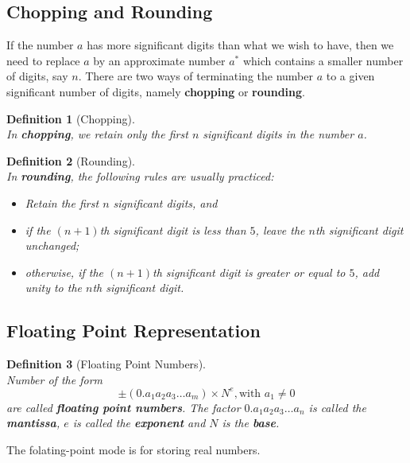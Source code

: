 \documentclass[12pt]{article}
\newtheorem{definition}{Definition}[section]
\theoremstyle{definition}
\begin{document}
\subsection{Chopping and Rounding}
If the number $a$ has more significant digits than what we wish to have, then we need to replace $a$ by an approximate number $a^\ast$ which contains a smaller number of digits, say $n$. There are two ways of terminating the number $a$ to a given significant number of digits, namely \textbf{chopping} or \textbf{rounding}.
\begin{definition}[Chopping]
\hfill\\\normalfont In \textbf{chopping}, we retain only the first $n$ significant digits in the number $a$.
\end{definition}
\begin{definition}[Rounding]
\hfill\\\normalfont In \textbf{rounding}, the following rules are usually practiced:
\begin{itemize}
  \item Retain the first $n$ significant digits, and
  \item if the $(n+1)$th significant digit is less than $5$, leave the $n$th significant digit unchanged;
  \item otherwise, if the $(n+1)$th significant digit is greater or equal to $5$, add unity to the $n$th significant digit.
\end{itemize}
\end{definition}
\subsection{Floating Point Representation}
\begin{definition}[Floating Point Numbers]
\hfill\\\normalfont Number of the form
\[
\pm(0.a_1a_2a_3\ldots a_m)\times N^e, \text{with }a_1\neq 0
\]
are called \textbf{floating point numbers}. The factor $0.a_1a_2a_3\ldots a_n$ is called the \textbf{mantissa}, $e$ is called the \textbf{exponent} and $N$ is the \textbf{base}.
\end{definition}
The folating-point mode is for storing real numbers.
\end{document}
